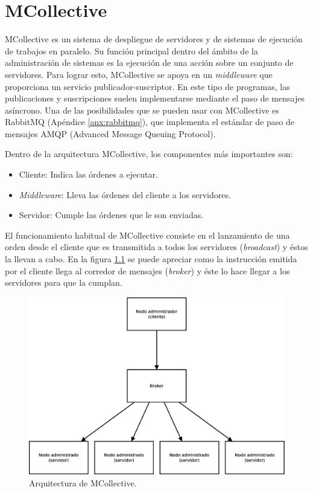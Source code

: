 \chapter{MCollective}
\label{anx:mcollective}


MCollective es un sistema de despliegue de servidores y de sistemas de ejecución de trabajos en paralelo. Su función principal dentro del ámbito de la administración de sistemas es la ejecución de una acción sobre un conjunto de servidores. Para lograr esto, MCollective se apoya en un \emph{middleware} que proporciona un servicio publicador-suscriptor. En este tipo de programas, las publicaciones y suscripciones suelen implementarse mediante el paso de mensajes asíncrono. Una de las posibilidades que se pueden usar con MCollective es RabbitMQ (Apéndice \ref{anx:rabbitmq}), que implementa el estándar de paso de mensajes AMQP (Advanced Message Queuing Protocol).

Dentro de la arquitectura MCollective, los componentes más importantes son:
\begin{itemize}
\item Cliente: Indica las órdenes a ejecutar.
\item \emph{Middleware}: Lleva las órdenes del cliente a los servidores.
\item Servidor: Cumple las órdenes que le son enviadas.
\end{itemize}

El funcionamiento habitual de MCollective consiste en el lanzamiento de una orden desde el cliente que es transmitida a todos los servidores (\emph{broadcast}) y éstos la llevan a cabo. En la figura \ref{figure:arquitectura-mcollective} se puede apreciar como la instrucción emitida por el cliente llega al corredor de mensajes (\emph{broker}) y éste lo hace llegar a los servidores para que la cumplan.

\begin{figure} [!htbp]
  \centering
  \includegraphics[width=13.5cm]{figuras/Arquitectura_MCollective.eps}
  \caption{Arquitectura de MCollective.}
\label{figure:arquitectura-mcollective}
\end{figure}

